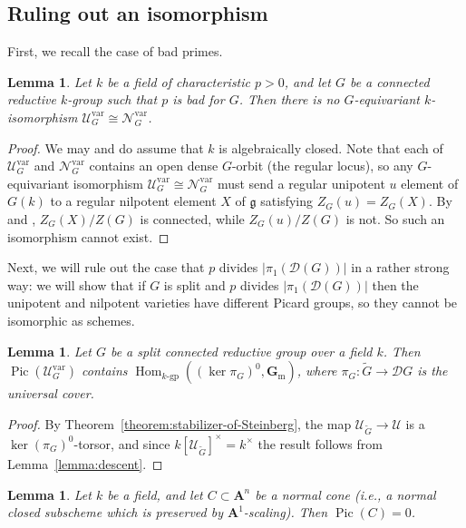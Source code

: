 \documentclass[11pt,reqno]{amsart}
\newtheorem{lemma}[theorem]{Lemma}
\theoremstyle{definition}
\renewcommand{\rm}{\mathrm}
\newcommand{\bA}{{\mathbf A}}
\newcommand{\bG}{{\mathbf G}}
\newcommand{\sD}{{\mathscr D}}
\newcommand{\sN}{{\mathscr N}}
\newcommand{\sU}{{\mathscr U}}
\newcommand{\fg}{\mathfrak{g}}
\newcommand{\bGm}{\bG_{\rm{m}}}
\DeclareMathOperator{\Hom}{Hom}
\DeclareMathOperator{\Pic}{Pic}
\begin{document}
\subsection{Ruling out an isomorphism}\label{subsection:no-springer-iso}

First, we recall the case of bad primes.

\begin{lemma}\label{lemma:no-springer-bad}
Let $k$ be a field of characteristic $p > 0$, and let $G$ be a connected reductive $k$-group such that $p$ is bad for $G$. Then there is no $G$-equivariant $k$-isomorphism $\sU_G^{\rm{var}} \cong \sN_G^{\rm{var}}$.
\end{lemma}

\begin{proof}
We may and do assume that $k$ is algebraically closed. Note that each of $\sU_G^{\rm{var}}$ and $\sN_G^{\rm{var}}$ contains an open dense $G$-orbit (the regular locus), so any $G$-equivariant isomorphism $\sU_G^{\rm{var}} \cong \sN_G^{\rm{var}}$ must send a regular unipotent $u$ element of $G(k)$ to a regular nilpotent element $X$ of $\fg$ satisfying $Z_G(u) = Z_G(X)$. By \cite[Thms.\ 4.12 and 5.9 b)]{Springer} and \cite[Theorem (b)]{Keny-nilpotent}, $Z_G(X)/Z(G)$ is connected, while $Z_G(u)/Z(G)$ is not. So such an isomorphism cannot exist.
\end{proof}

Next, we will rule out the case that $p$ divides $|\pi_1(\sD(G))|$ in a rather strong way: we will show that if $G$ is split and $p$ divides $|\pi_1(\sD(G))|$ then the unipotent and nilpotent varieties have different Picard groups, so they cannot be isomorphic as schemes.



\begin{lemma}\label{lemma:unip-pic}
Let $G$ be a split connected reductive group over a field $k$. Then $\Pic(\sU_G^{\rm{var}})$ contains $\Hom_{k\textrm{-}\mathrm{gp}}((\ker \pi_G)^0, \bGm)$, where $\pi_G\colon \widetilde{G} \to \sD G$ is the universal cover.
\end{lemma}

\begin{proof}
By Theorem~\ref{theorem:stabilizer-of-Steinberg}, the map $\sU_{\widetilde{G}} \to \sU$ is a $\ker(\pi_G)^0$-torsor, and since $k[\sU_{\widetilde{G}}]^\times = k^\times$ the result follows from Lemma~\ref{lemma:descent}.
\end{proof}

\begin{lemma}\label{lemma:picard-normal-cone}
Let $k$ be a field, and let $C \subset \bA^n$ be a normal cone (i.e., a normal closed subscheme which is preserved by $\bA^1$-scaling). Then $\Pic(C) = 0$.
\end{lemma}
\end{document}
